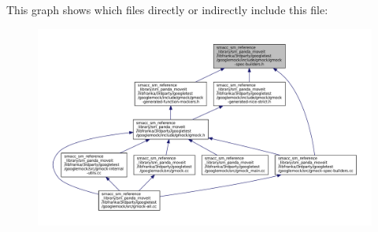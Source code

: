 This graph shows which files directly or indirectly include this file\+:
\nopagebreak
\begin{figure}[H]
\begin{center}
\leavevmode
\includegraphics[width=350pt]{gmock-spec-builders_8h__dep__incl}
\end{center}
\end{figure}
